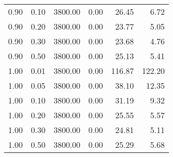 \begin{table}
\begin{tabular}{rrrrrr}
0.90 & 0.10 & 3800.00 & 0.00 & 26.45 & 6.72 \\
0.90 & 0.20 & 3800.00 & 0.00 & 23.77 & 5.05 \\
0.90 & 0.30 & 3800.00 & 0.00 & 23.68 & 4.76 \\
0.90 & 0.50 & 3800.00 & 0.00 & 25.13 & 5.41 \\
1.00 & 0.01 & 3800.00 & 0.00 & 116.87 & 122.20 \\
1.00 & 0.05 & 3800.00 & 0.00 & 38.10 & 12.35 \\
1.00 & 0.10 & 3800.00 & 0.00 & 31.19 & 9.32 \\
1.00 & 0.20 & 3800.00 & 0.00 & 25.55 & 5.57 \\
1.00 & 0.30 & 3800.00 & 0.00 & 24.81 & 5.11 \\
1.00 & 0.50 & 3800.00 & 0.00 & 25.29 & 5.68 \\
\bottomrule
\end{tabular}
\end{table}
